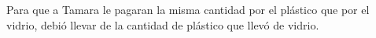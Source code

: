 Para que a Tamara le pagaran la misma cantidad por el plástico que por el vidrio, debió llevar
\fillin[un tercio][1cm] de la cantidad de plástico que llevó de vidrio.